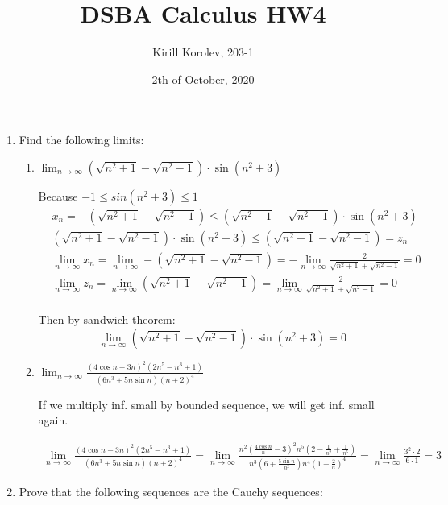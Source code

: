 \documentclass{article}
\title{DSBA Calculus HW4}
\author{Kirill Korolev, 203-1}
\date{2th of October, 2020}
\begin{document}
\maketitle

\begin{enumerate}

\item Find the following limits:

\begin{enumerate}
\item $\lim_{n \to \infty} (\sqrt{n^2 + 1} - \sqrt{n^2 - 1}) \cdot \sin{(n^2 + 3)}$


Because $-1 \leq sin(n^2 + 3) \leq 1$
\begin{align*}
&x_n = -(\sqrt{n^2 + 1} - \sqrt{n^2 - 1}) \leq (\sqrt{n^2 + 1} - \sqrt{n^2 - 1}) \cdot \sin{(n^2 + 3)}\\
&(\sqrt{n^2 + 1} - \sqrt{n^2 - 1}) \cdot \sin{(n^2 + 3)} \leq (\sqrt{n^2 + 1} - \sqrt{n^2 - 1}) = z_n\\
&\lim_{n \to \infty} x_n = \lim_{n \to \infty} -(\sqrt{n^2 + 1} - \sqrt{n^2 - 1}) = -\lim_{n \to \infty} \frac{2}{\sqrt{n^2 + 1} + \sqrt{n^2 - 1}} = 0\\
&\lim_{n \to \infty} z_n = \lim_{n \to \infty} (\sqrt{n^2 + 1} - \sqrt{n^2 - 1}) = \lim_{n \to \infty} \frac{2}{\sqrt{n^2 + 1} + \sqrt{n^2 - 1}} = 0\\
\end{align*}

Then by sandwich theorem:
\[\lim_{n \to \infty} (\sqrt{n^2 + 1} - \sqrt{n^2 - 1}) \cdot \sin{(n^2 + 3)}=0\]

\item $\lim_{n \to \infty} \frac{(4\cos{n} - 3n)^2(2n^5 - n^3 + 1)}{(6n^3 + 5n\sin{n})(n + 2)^4}$

If we multiply inf. small by bounded sequence, we will get inf. small again. 

\begin{align*}
\lim_{n \to \infty} \frac{(4\cos{n} - 3n)^2(2n^5 - n^3 + 1)}{(6n^3 + 5n\sin{n})(n + 2)^4} = \lim_{n \to \infty} \frac{n^2(\frac{4\cos{n}}{n} - 3)^2n^5(2 - \frac{1}{n^2} + \frac{1}{n^5})}{n^3(6 + \frac{5\sin{n}}{n^2})n^4(1 + \frac{2}{n})^4} = \lim_{n \to \infty} \frac{3^2 \cdot 2}{6 \cdot 1} = 3
\end{align*}

\end{enumerate}

\item Prove that the following sequences are the Cauchy sequences:


\end{enumerate}
\end{document}
